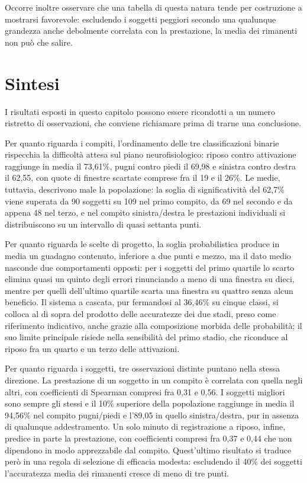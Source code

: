 Occorre inoltre osservare che una tabella di questa natura tende per costruzione a mostrarsi favorevole: escludendo i soggetti peggiori secondo una qualunque grandezza anche debolmente correlata con la prestazione, la media dei rimanenti non può che salire.

\section{Sintesi}
I risultati esposti in questo capitolo possono essere ricondotti a un numero ristretto di osservazioni, che conviene richiamare prima di trarne una conclusione.

Per quanto riguarda i compiti, l'ordinamento delle tre classificazioni binarie rispecchia la difficoltà attesa sul piano neurofisiologico: riposo contro attivazione raggiunge in media il 73,61\%, pugni contro piedi il 69,98 e sinistra contro destra il 62,55, con quote di finestre scartate comprese fra il 19 e il 26\%. Le medie, tuttavia, descrivono male la popolazione: la soglia di significatività del 62,7\% viene superata da 90 soggetti su 109 nel primo compito, da 69 nel secondo e da appena 48 nel terzo, e nel compito sinistra/destra le prestazioni individuali si distribuiscono su un intervallo di quasi settanta punti.

Per quanto riguarda le scelte di progetto, la soglia probabilistica produce in media un guadagno contenuto, inferiore a due punti e mezzo, ma il dato medio nasconde due comportamenti opposti: per i soggetti del primo quartile lo scarto elimina quasi un quinto degli errori rinunciando a meno di una finestra su dieci, mentre per quelli dell'ultimo quartile scarta una finestra su quattro senza alcun beneficio. Il sistema a cascata, pur fermandosi al 36,46\% su cinque classi, si colloca al di sopra del prodotto delle accuratezze dei due stadi, preso come riferimento indicativo, anche grazie alla composizione morbida delle probabilità; il suo limite principale risiede nella sensibilità del primo stadio, che riconduce al riposo fra un quarto e un terzo delle attivazioni.

Per quanto riguarda i soggetti, tre osservazioni distinte puntano nella stessa direzione. La prestazione di un soggetto in un compito è correlata con quella negli altri, con coefficienti di Spearman compresi fra 0,31 e 0,56. I soggetti migliori sono sempre gli stessi e il 10\% superiore della popolazione raggiunge in media il 94,56\% nel compito pugni/piedi e l'89,05 in quello sinistra/destra, pur in assenza di qualunque addestramento. Un solo minuto di registrazione a riposo, infine, predice in parte la prestazione, con coefficienti compresi fra 0,37 e 0,44 che non dipendono in modo apprezzabile dal compito. Quest'ultimo risultato si traduce però in una regola di selezione di efficacia modesta: escludendo il 40\% dei soggetti l'accuratezza media dei rimanenti cresce di meno di tre punti.